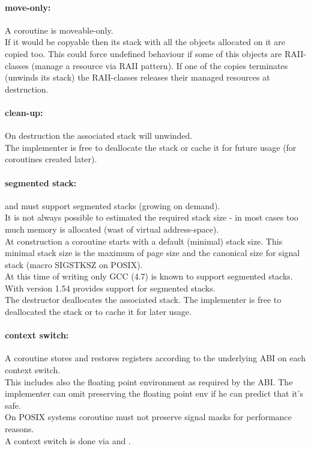 \paragraph*{move-only:}
A coroutine is moveable-only.\\
\newline
If it would be copyable then its stack with all the objects allocated on it
are copied too. This could force undefined behaviour if some of this objects are
RAII-classes (manage a resource via RAII pattern). If one of the copies
terminates (unwinds its stack) the RAII-classes releases their managed resources
at destruction.

\paragraph*{clean-up:}
On destruction the associated stack will unwinded.\\
\newline
The implementer is free to deallocate the stack or cache it for future usage
(for coroutines created later).

\paragraph*{segmented stack:}
\pushcoro and \pullcoro must support segmented stacks (growing on demand).\\
\newline
It is not always possible to estimated the required stack size - in most cases
too much memory is allocated (wast of virtual address-space).\\
\newline
At construction a coroutine starts with a default (minimal) stack size. This
minimal stack size is the maximum of page size and the canonical size for signal
stack (macro SIGSTKSZ on POSIX).\\
\newline
At this time of writing only GCC (4.7)\cite{gccsplit} is known to support
segmented stacks. With version 1.54 \boostcoroutine provides support for
segmented stacks.\\
\newline
The destructor deallocates the associated stack. The implementer is free to
deallocated the stack or to cache it for later usage.

\paragraph*{context switch:}
A coroutine stores and restores registers according to the underlying ABI on
each context switch.\\
\newline
This includes also the floating point environment as required by the ABI. The
implementer can omit preserving the floating point env if he can predict that
it's safe.\\
\newline
On POSIX systems coroutine must not preserve signal masks for performance
reasons.\\
\newline
A context switch is done via \pushcoroop and \pullcoroop.

